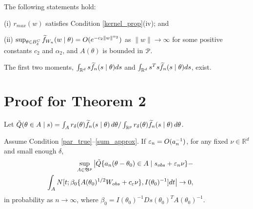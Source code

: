 \begin{condition} \label{sum_approx_tail}
	The following statements hold: 
	
	(i) $r_{max}(w)$ satisfies
	Condition \ref{kernel_prop}(iv); and 
	
	(ii) $\sup_{\theta\in B_{\delta}^{C}}\widetilde{f}_{W_{n}}(w\mid\theta)=O(e^{-c_{2}\|w\|^{\alpha_{2}}})$
	as $\|w\|\rightarrow\infty$ for some positive constants $c_{2}$
	and $\alpha_{2}$, and $A(\theta)$ is bounded in ${\cal P}$. 
\end{condition}

\begin{condition} \label{cond:likelihood_moments}
	The first two moments, $\int_{\mathbb{R}^{d}}s\widetilde{f}_{n}(s\mid\theta)ds$
	and $\int_{\mathbb{R}^d}s^{T}s\widetilde{f}_{n}(s\mid\theta)ds$, exist. 
\end{condition}


\section{Proof for Theorem 2}

\noindent Let $\tilde{Q}(\theta\in A\mid s)=\int_{A}r_{\delta}(\theta)\widetilde{f}_{n}(s\mid\theta)\,d\theta/\int_{\mathbb{R}^{p}}r_{\delta}(\theta)\widetilde{f}_{n}(s\mid\theta)\,d\theta$. %

\begin{lemma}\label{Alemma1} Assume Condition \ref{par_true}--\ref{sum_approx}. If $\varepsilon_{n}=O(a_{n}^{-1})$, for any fixed $\nu\in\mathbb{R}^{d}$
	and small enough $\delta$, 
	\begin{eqnarray*}
	&&\hspace{-2cm}\sup_{A\in\mathfrak{B}^{p}}\big|\tilde{Q}\{a_{n}(\theta-\theta_{0})\in A\mid s_{\rm obs}+\veps_{n}\nu\}- \\
	&&\hspace{-1cm}\int_{A}N[t;\beta_{0}\{A(\theta_{0})^{1/2}W_{\rm obs}+c_{\veps}\nu\},I(\theta_{0})^{-1}]dt\big|\rightarrow0,
	\end{eqnarray*}
	in probability as $n\rightarrow\infty$, where $\beta_{0}=I(\theta_{0})^{-1}Ds(\theta_{0})^{T}A(\theta_{0})^{-1}$.
\end{lemma}

